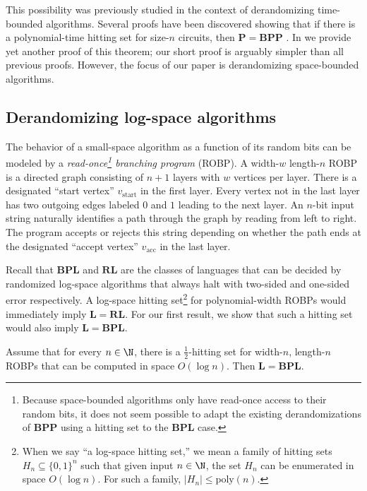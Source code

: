This possibility was previously studied in the context of derandomizing time-bounded algorithms. Several proofs have been discovered showing that if there is a polynomial-time hitting set for size-$n$ circuits, then $\mathbf{P} = \mathbf{BPP}$ \cite{ACR98,BF99,ACRT99,GVW11}. In  we provide yet another proof of this theorem; our short proof is arguably simpler than all previous proofs. However, the focus of our paper is derandomizing space-bounded algorithms.

\subsection{Derandomizing log-space algorithms}

The behavior of a small-space algorithm as a function of its random bits can be modeled by a \emph{read-once\footnote{Because space-bounded algorithms only have read-once access to their random bits, it does not seem possible to adapt the existing derandomizations of $\mathbf{BPP}$ using a hitting set to the $\mathbf{BPL}$ case.} branching program} (ROBP). A width-$w$ length-$n$ ROBP is a directed graph consisting of $n + 1$ layers with $w$ vertices per layer. There is a designated ``start vertex'' $v_{\text{start}}$ in the first layer. Every vertex not in the last layer has two outgoing edges labeled $0$ and $1$ leading to the next layer. An $n$-bit input string naturally identifies a path through the graph by reading from left to right. The program accepts or rejects this string depending on whether the path ends at the designated ``accept vertex'' $v_{\text{acc}}$ in the last layer.

Recall that $\mathbf{BPL}$ and $\mathbf{RL}$ are the classes of languages that can be decided by randomized log-space algorithms that always halt with two-sided and one-sided error respectively. A log-space hitting set\footnote{When we say ``a log-space hitting set,'' we mean a family of hitting sets $H_n \subseteq \{0, 1\}^n$ such that given input $n \in \N$, the set $H_n$ can be enumerated in space $O(\log n)$. For such a family, $|H_n| \leq \text{poly}(n)$.} for polynomial-width ROBPs would immediately imply $\mathbf{L} = \mathbf{RL}$. For our first result, we show that such a hitting set would also imply $\mathbf{L}= \mathbf{BPL}$.

\begin{theorem} \label{thm:poly-width-main}
Assume that for every $n \in \N$, there is a $\frac{1}{2}$-hitting set for width-$n$, length-$n$ ROBPs that can be computed in space $O(\log n)$. Then $\mathbf{L} = \mathbf{BPL}$.
\end{theorem}

